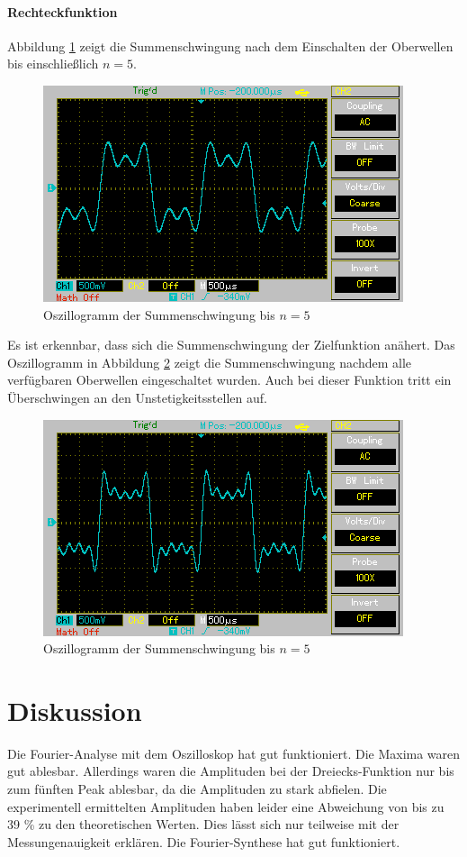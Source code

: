 \documentclass[11pt,ngerman,a4paper]{article}
\begin{document}
\paragraph{Rechteckfunktion}
Abbildung \ref{rect_1} zeigt die Summenschwingung nach dem Einschalten der Oberwellen bis einschlie\ss lich $ n = 5$. 
\begin{figure}[htp]
\centering
\includegraphics[scale=0.8]{Screenshots/rect_1.png}
\caption{Oszillogramm  der Summenschwingung bis $n = 5$}
\label{rect_1}
\end{figure}
Es ist erkennbar, dass sich die Summenschwingung der Zielfunktion an\"ahert. Das Oszillogramm in Abbildung \ref{rect_2} zeigt die Summenschwingung nachdem alle verf\"ugbaren Oberwellen eingeschaltet wurden. Auch bei dieser Funktion tritt ein \"Uberschwingen an den Unstetigkeitsstellen auf.
\begin{figure}[htp]
\centering
\includegraphics[scale=0.8]{Screenshots/rec_2.png}
\caption{Oszillogramm  der Summenschwingung bis $n = 5$}
\label{rect_2}
\end{figure}
\section{Diskussion}
Die Fourier-Analyse mit dem Oszilloskop hat gut funktioniert. Die Maxima waren gut ablesbar. Allerdings waren die Amplituden bei der Dreiecks-Funktion nur bis zum fünften Peak ablesbar, da die Amplituden zu stark abfielen. Die experimentell ermittelten Amplituden haben leider eine Abweichung von bis zu 39 \% zu den theoretischen Werten. Dies lässt sich nur teilweise mit der Messungenauigkeit erklären. Die Fourier-Synthese hat gut funktioniert.
\end{document}
